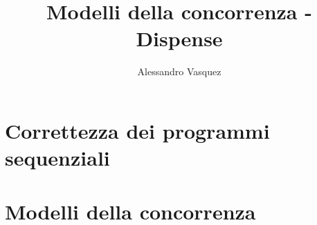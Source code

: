 \documentclass[11pt,a4paper]{report}
\author{Alessandro Vasquez}
\title{Modelli della concorrenza - Dispense}
\begin{document}
	\maketitle
	\newpage
	\tableofcontents
	\newpage
	
	\part{Correttezza dei programmi sequenziali}
	
	\part{Modelli della concorrenza}
	
\end{document}
